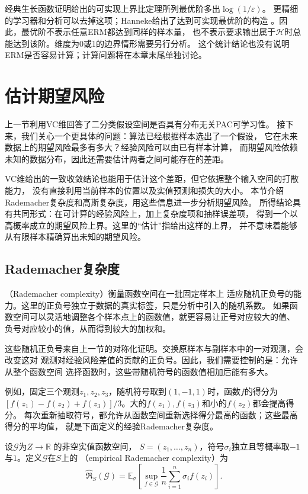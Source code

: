 经典生长函数证明给出的可实现上界比定理所列最优阶多出$\log(1/\varepsilon)$。
更精细的学习器和分析可以去掉这项；Hanneke给出了达到可实现最优阶的构造
。因此，最优阶不表示任意ERM都达到同样的样本量，
也不表示要求输出属于$\mathcal H$时总能达到该阶。维度为0或1的边界情形需要另行分析。
这个统计结论也没有说明ERM是否容易计算；计算问题将在本章末尾单独讨论。

\section{估计期望风险}
\label{sec:rademacher-complexity}

上一节利用VC维回答了二分类假设空间是否具有分布无关PAC可学习性。
接下来，我们关心一个更具体的问题：算法已经根据样本选出了一个假设，
它在未来数据上的期望风险最多有多大？经验风险可以由已有样本计算，
而期望风险依赖未知的数据分布，因此还需要估计两者之间可能存在的差距。

VC维给出的一致收敛结论也能用于估计这个差距，但它依据整个输入空间的打散能力，
没有直接利用当前样本的位置以及实值预测和损失的大小。
本节介绍Rademacher复杂度和高斯复杂度，用这些信息进一步分析期望风险。
所得结论具有共同形式：在可计算的经验风险上，加上复杂度项和抽样误差项，
得到一个以高概率成立的期望风险上界。这里的“估计”指给出这样的上界，
并不意味着能够从有限样本精确算出未知的期望风险。

\subsection{Rademacher复杂度}

（Rademacher complexity）衡量函数空间在一批固定样本上
适应随机正负号的能力。这里的正负号独立于数据的真实标签，只是分析中引入的随机系数。
如果函数空间可以灵活地调整各个样本点上的函数值，就更容易让正号对应较大的值、
负号对应较小的值，从而得到较大的加权和。

这些随机正负号来自上一节的对称化证明。交换原样本与副样本中的一对观测，会改变这对
观测对经验风险差值的贡献的正负号。因此，我们需要控制的是：允许从整个函数空间
选择函数时，这些带随机符号的函数值相加后能有多大。

例如，固定三个观测$z_1,z_2,z_3$，随机符号取到$(1,-1,1)$时，函数$f$的得分为
$[f(z_1)-f(z_2)+f(z_3)]/3$。大的$f(z_1),f(z_3)$和小的$f(z_2)$都会提高得分。
每次重新抽取符号，都允许从函数空间重新选择得分最高的函数；这些最高得分的平均值，
就是下面定义的经验Rademacher复杂度。

\begin{definition}[经验Rademacher复杂度]
\label{def:rademacher-complexity}
设$\mathcal G$为$Z\to\mathbb R$
的非空实值函数空间，
$S=(z_1,\ldots,z_n)$，符号$\sigma_i$独立且等概率取$-1$与$1$。定义$\mathcal G$在$S$上的
（empirical Rademacher complexity）为
\begin{equation}
 \widehat{\mathfrak R}_S(\mathcal G)
 =\mathbb E_\sigma\left[\sup_{f\in\mathcal G}
       \frac1n\sum_{i=1}^n\sigma_i f(z_i)\right].
 \label{eq:empirical-rademacher}
\end{equation}
\end{definition}

